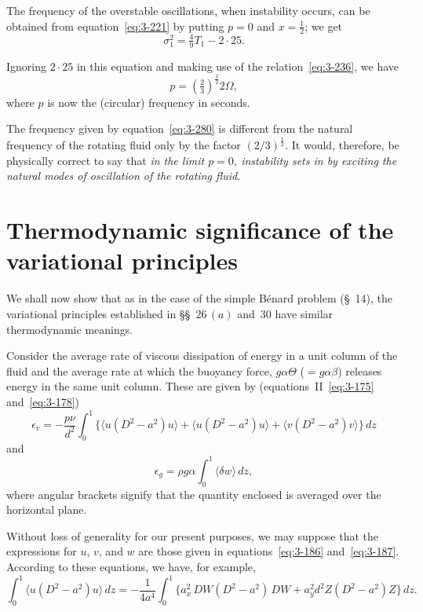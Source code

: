 The frequency of the overstable oscillations, when instability occurs, can be obtained from equation~\eqref{eq:3-221} by putting $p = 0$ and $x = \frac{1}{2}$; we get
\begin{equation}\label{eq:3-279}
\sigma_1^2 = \tfrac{4}{9}T_1 - 2{\cdot}25.
\end{equation}

Ignoring $2{\cdot}25$ in this equation and making use of the relation~\eqref{eq:3-236}, we have
\begin{equation}\label{eq:3-280}
p = (\tfrac{2}{3})^{\frac{1}{2}} 2\Omega,
\end{equation}
where $p$ is now the (circular) frequency in seconds.

The frequency given by equation~\eqref{eq:3-280} is different from the natural frequency of the rotating fluid only by the factor $(2/3)^{\frac{1}{2}}$. It would, therefore, be physically correct to say that \emph{in the limit $p = 0$, instability sets in by exciting the natural modes of oscillation of the rotating fluid}.

\section{Thermodynamic significance of the variational principles}\label{sec:3-33}

We shall now show that as in the case of the simple B\'enard problem (\S~14), the variational principles established in \S\S~26\,$(a)$ and~30 have similar thermodynamic meanings.

Consider the average rate of viscous dissipation of energy in a unit column of the fluid and the average rate at which the buoyancy force, $g\alpha\Theta$ ($= g\alpha\beta$) releases energy in the same unit column. These are given by (equations~II~\eqref{eq:3-175} and~\eqref{eq:3-178})
\begin{equation}\label{eq:3-281}
\epsilon_v = -\frac{p\nu}{d^2}\int_0^1\big\{\langle u(D^2 - a^2)u\rangle + \langle u(D^2 - a^2)u\rangle + \langle v(D^2 - a^2)v\rangle\big\}\,dz
\end{equation}
and
\begin{equation}\label{eq:3-282}
\epsilon_g = \rho g\alpha\int_0^1 \langle\delta w\rangle\,dz,
\end{equation}
where angular brackets signify that the quantity enclosed is averaged over the horizontal plane.

Without loss of generality for our present purposes, we may suppose that the expressions for $u$, $v$, and $w$ are those given in equations~\eqref{eq:3-186} and~\eqref{eq:3-187}. According to these equations, we have, for example,
\begin{equation}\label{eq:3-283}
\int_0^1 \langle u(D^2 - a^2)u\rangle\,dz = -\frac{1}{4a^4}\int_0^1 \{a_x^2\,DW(D^2 - a^2)\,DW + a_y^2 d^2 Z(D^2 - a^2)Z\}\,dz.
\end{equation}

